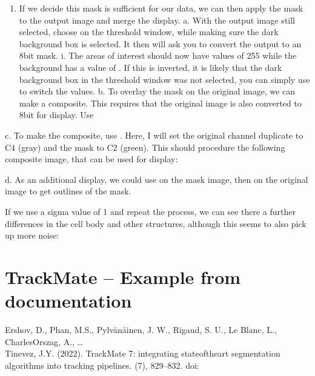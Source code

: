 \documentclass[letterpaper,10pt,english]{jupyterBook}
\begin{document}
\sphinxAtStartPar
{}
\begin{enumerate}
%
\setcounter{enumi}{5}
\item {} 
\sphinxAtStartPar
If we decide this mask is sufficient for our data, we can then apply the mask to the output
image and merge the display.
a. With the output image still selected, choose  on the threshold window,
while making sure the dark background box is selected. It then will ask you to
convert the output to an 8\sphinxhyphen{}bit mask.
i. The areas of interest should now have values of 255 while the
background has a value of . If this is inverted, it is likely that the dark
background box in the threshold window was not selected, you can simply
use  to switch the values.
b. To overlay the mask on the original image, we can make a composite. This
requires that the original image is also converted to 8\sphinxhyphen{}bit for display. Use 

\end{enumerate}

\sphinxAtStartPar
c. To make the composite, use . Here, I will set
the original channel duplicate to C4 (gray) and the mask to C2 (green). This
should procedure the following composite image, that can be used for display:

\sphinxAtStartPar
{}

\sphinxAtStartPar
d. As an additional display, we could use  on the mask image,
then  on the original image to get outlines of the mask.

\sphinxAtStartPar
If we use a sigma value of 1 and repeat the process, we can see there a further differences in
the cell body and other structures, although this seems to also pick up more noise:

\sphinxAtStartPar
{}

\sphinxstepscope


\chapter{TrackMate – Example from documentation}
\label{\detokenize{trackmate:trackmate-example-from-documentation}}\label{\detokenize{trackmate::doc}}
\sphinxAtStartPar
Ershov, D., Phan, M.\sphinxhyphen{}S., Pylvänäinen, J. W., Rigaud, S. U., Le Blanc, L., Charles\sphinxhyphen{}Orszag, A., …\\
Tinevez, J.\sphinxhyphen{}Y. (2022). TrackMate 7: integrating state\sphinxhyphen{}of\sphinxhyphen{}the\sphinxhyphen{}art segmentation algorithms into tracking pipelines. (7), 829–832. doi:
\end{document}
